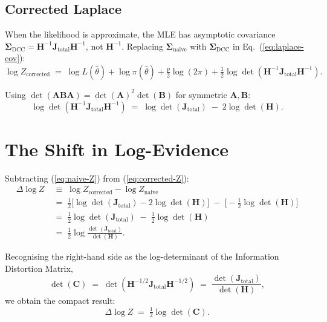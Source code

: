 \documentclass[11pt]{article}
\begin{document}
\subsection{Corrected Laplace}

When the likelihood is approximate, the MLE has asymptotic covariance $\boldsymbol\Sigma_{\mathrm{DCC}} = \mathbf H^{-1}\mathbf J_{\mathrm{total}}\mathbf H^{-1}$, not $\mathbf H^{-1}$. Replacing $\boldsymbol\Sigma_{\mathrm{naive}}$ with $\boldsymbol\Sigma_{\mathrm{DCC}}$ in Eq.~(\ref{eq:laplace-cov}):
\begin{equation}
\log Z_{\mathrm{corrected}}
\;=\;
\log L(\hat\theta)
+ \log\pi(\hat\theta)
+ \tfrac{p}{2}\log(2\pi)
+ \tfrac{1}{2}\log\det\!\left(\mathbf H^{-1}\mathbf J_{\mathrm{total}}\mathbf H^{-1}\right).
\label{eq:corrected-Z}
\end{equation}

Using $\det(\mathbf A\mathbf B\mathbf A) = \det(\mathbf A)^2 \det(\mathbf B)$ for symmetric $\mathbf A,\mathbf B$:
\begin{equation}
\log\det\!\left(\mathbf H^{-1}\mathbf J_{\mathrm{total}}\mathbf H^{-1}\right)
\;=\;
\log\det(\mathbf J_{\mathrm{total}})
\;-\;
2\log\det(\mathbf H).
\end{equation}

\section{The Shift in Log-Evidence}

Subtracting (\ref{eq:naive-Z}) from (\ref{eq:corrected-Z}):
\begin{align}
\Delta \log Z
\;&\equiv\;
\log Z_{\mathrm{corrected}} - \log Z_{\mathrm{naive}}
\\[4pt]
&=\;
\tfrac{1}{2}\bigl[\log\det(\mathbf J_{\mathrm{total}}) - 2\log\det(\mathbf H)\bigr]
\;-\;
\bigl[-\tfrac{1}{2}\log\det(\mathbf H)\bigr]
\\[4pt]
&=\;
\tfrac{1}{2}\log\det(\mathbf J_{\mathrm{total}})
\;-\;
\tfrac{1}{2}\log\det(\mathbf H)
\\[4pt]
&=\;
\tfrac{1}{2}\log\frac{\det(\mathbf J_{\mathrm{total}})}{\det(\mathbf H)}.
\end{align}

Recognising the right-hand side as the log-determinant of the Information Distortion Matrix,
\begin{equation}
\det(\mathbf C)
\;=\;
\det\!\left(\mathbf H^{-1/2}\mathbf J_{\mathrm{total}}\mathbf H^{-1/2}\right)
\;=\;
\frac{\det(\mathbf J_{\mathrm{total}})}{\det(\mathbf H)},
\end{equation}
we obtain the compact result:
\begin{equation}
\boxed{\;
\Delta \log Z
\;=\;
\tfrac{1}{2}\log\det(\mathbf C).
\;}
\label{eq:main-result}
\end{equation}
\end{document}
